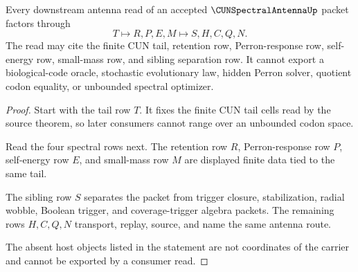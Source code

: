 \begin{theorem}
\label{thm:cun-spectral-antenna-downstream-separation}
Every downstream antenna read of an accepted $\CUNSpectralAntennaUp$ packet factors through
$$
T \longmapsto R,P,E,M \longmapsto S,H,C,Q,N.
$$
The read may cite the finite CUN tail, retention row, Perron-response row, self-energy row, small-mass row, and sibling separation row. It cannot export a biological-code oracle, stochastic evolutionary law, hidden Perron solver, quotient codon equality, or unbounded spectral optimizer.
\end{theorem}
\begin{proof}
Start with the tail row $T$. It fixes the finite CUN tail cells read by the source theorem, so later consumers cannot range over an unbounded codon space.

Read the four spectral rows next. The retention row $R$, Perron-response row $P$, self-energy row $E$, and small-mass row $M$ are displayed finite data tied to the same tail.

The sibling row $S$ separates the packet from trigger closure, stabilization, radial wobble, Boolean trigger, and coverage-trigger algebra packets. The remaining rows $H,C,Q,N$ transport, replay, source, and name the same antenna route.

The absent host objects listed in the statement are not coordinates of the carrier and cannot be exported by a consumer read.
\end{proof}




